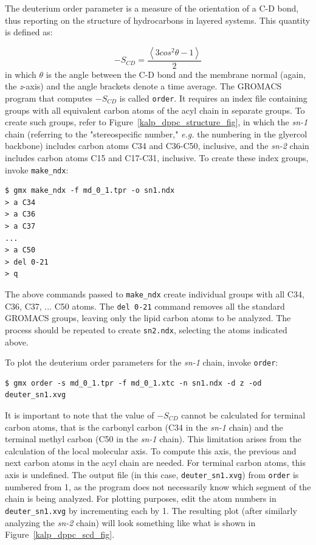 \documentclass[9pt,tutorial,pubversion]{livecoms}
\begin{document}
The deuterium order parameter is a measure of the orientation of a C-D bond, thus reporting on the structure of hydrocarbons in layered systems. This quantity is defined as:

\begin{equation} \label{eq_scd}
-S_{CD} = \frac{\left\langle 3 cos^2 \theta - 1\right\rangle}{2}
\end{equation}
%
in which $\theta$ is the angle between the C-D bond and the membrane normal (again, the {\em z}-axis) and the angle brackets denote a time average. The GROMACS program that computes $-S_{CD}$ is called \texttt{order}. It requires an index file containing groups with all equivalent carbon atoms of the acyl chain in separate groups. To create such groups, refer to Figure~\ref{kalp_dppc_structure_fig}, in which the {\em sn-1} chain (referring to the "stereospecific number," {\em e.g.} the numbering in the glyercol backbone) includes carbon atoms C34 and C36-C50, inclusive, and the {\em sn-2} chain includes carbon atoms C15 and C17-C31, inclusive. To create these index groups, invoke \texttt{make\_ndx}:

\begin{lstlisting}
$ gmx make_ndx -f md_0_1.tpr -o sn1.ndx
> a C34
> a C36
> a C37
...
> a C50
> del 0-21
> q
\end{lstlisting}
%
The above commands passed to \texttt{make\_ndx} create individual groups with all C34, C36, C37, ... C50 atoms. The \texttt{del 0-21} command removes all the standard GROMACS groups, leaving only the lipid carbon atoms to be analyzed. The process should be repeated to create \texttt{sn2.ndx}, selecting the atoms indicated above.

To plot the deuterium order parameters for the {\em sn-1} chain, invoke \texttt{order}:

\begin{lstlisting}
$ gmx order -s md_0_1.tpr -f md_0_1.xtc -n sn1.ndx -d z -od deuter_sn1.xvg
\end{lstlisting}
%
It is important to note that the value of $-S_{CD}$ cannot be calculated for terminal carbon atoms, that is the carbonyl carbon (C34 in the {\em sn-1} chain) and the terminal methyl carbon (C50 in the {\em sn-1} chain). This limitation arises from the calculation of the local molecular axis. To compute this axis, the previous and next carbon atoms in the acyl chain are needed. For terminal carbon atoms, this axis is undefined. The output file (in this case, \texttt{deuter\_sn1.xvg}) from \texttt{order} is numbered from 1, as the program does not necessarily know which segment of the chain is being analyzed. For plotting purposes, edit the atom numbers in \texttt{deuter\_sn1.xvg} by incrementing each by 1. The resulting plot (after similarly analyzing the {\em sn-2} chain) will look something like what is shown in Figure~\ref{kalp_dppc_scd_fig}.
\end{document}
